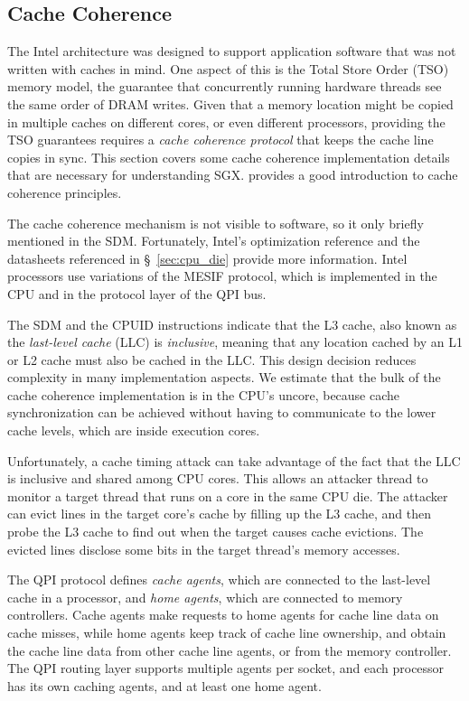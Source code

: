 \subsection{Cache Coherence}
\label{sec:cache_coherence}

The Intel architecture was designed to support application software that was
not written with caches in mind. One aspect of this is the Total Store Order
(TSO) \cite{owens2009tso} memory model, the guarantee that concurrently running
hardware threads see the same order of DRAM writes. Given that a memory
location might be copied in multiple caches on different cores, or even
different processors, providing the TSO guarantees requires a \textit{cache
coherence protocol} that keeps the cache line copies in sync. This section
covers some cache coherence implementation details that are necessary for
understanding SGX. \cite{hennessy2012architecture} provides a good introduction
to cache coherence principles.

The cache coherence mechanism is not visible to software, so it only briefly
mentioned in the SDM. Fortunately, Intel's optimization reference
\cite{intel2014optimization} and the datasheets referenced in
\S~\ref{sec:cpu_die} provide more information. Intel processors use variations
of the MESIF \cite{goodman2009mesif} protocol, which is implemented in the CPU
and in the protocol layer of the QPI bus.

The SDM and the CPUID instructions indicate that the L3 cache, also known as
the \textit{last-level cache} (LLC) is \textit{inclusive}, meaning that any
location cached by an L1 or L2 cache must also be cached in the LLC. This
design decision reduces complexity in many implementation aspects. We estimate
that the bulk of the cache coherence implementation is in the CPU's uncore,
because cache synchronization can be achieved without having to communicate to
the lower cache levels, which are inside execution cores.

Unfortunately, a cache timing attack can take advantage of the fact that the
LLC is inclusive and shared among CPU cores. This allows an attacker thread
to monitor a target thread that runs on a core in the same CPU die. The
attacker can evict lines in the target core's cache by filling up the L3 cache,
and then probe the L3 cache to find out when the target causes cache evictions.
The evicted lines disclose some bits in the target thread's memory accesses.

The QPI protocol defines \textit{cache agents}, which are connected to the
last-level cache in a processor, and \textit{home agents}, which are connected
to memory controllers. Cache agents make requests to home agents for cache line
data on cache misses, while home agents keep track of cache line ownership, and
obtain the cache line data from other cache line agents, or from the memory
controller. The QPI routing layer supports multiple agents per socket, and each
processor has its own caching agents, and at least one home agent.


